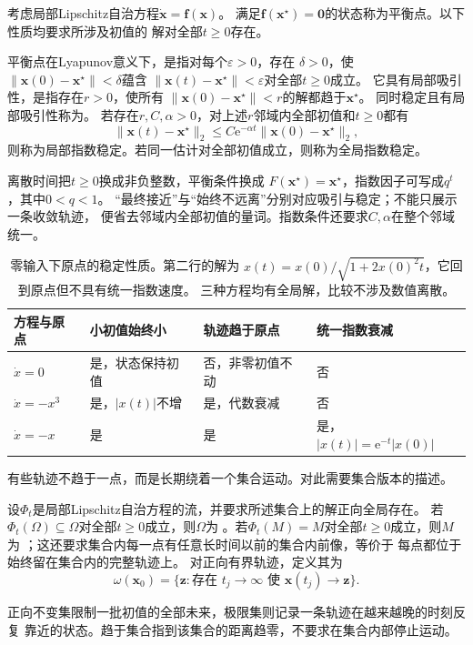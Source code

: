 \begin{definition}[平衡点与稳定性]
  \label{def:dynamical-equilibrium-stability}
  考虑局部Lipschitz自治方程$\dot{\bm x}=\bm f(\bm x)$。
  满足$\bm f(\bm x^\star)=\bm0$的状态称为平衡点。以下性质均要求所涉及初值的
  解对全部$t\geq0$存在。

  平衡点在Lyapunov意义下，是指对每个$\varepsilon>0$，存在
  $\delta>0$，使$\|\bm x(0)-\bm x^\star\|<\delta$蕴含
  $\|\bm x(t)-\bm x^\star\|<\varepsilon$对全部$t\geq0$成立。
  它具有局部吸引性，是指存在$r>0$，使所有
  $\|\bm x(0)-\bm x^\star\|<r$的解都趋于$\bm x^\star$。
  同时稳定且有局部吸引性称为。
  若存在$r,C,\alpha>0$，对上述$r$邻域内全部初值和$t\geq0$都有
  \[
    \|\bm x(t)-\bm x^\star\|_2
    \leq C\mathrm e^{-\alpha t}\|\bm x(0)-\bm x^\star\|_2,
  \]
  则称为局部指数稳定。若同一估计对全部初值成立，则称为全局指数稳定。
\end{definition}
离散时间把$t\geq0$换成非负整数，平衡条件换成
$F(\bm x^\star)=\bm x^\star$，指数因子可写成$q^t$，其中$0<q<1$。
“最终接近”与“始终不远离”分别对应吸引与稳定；不能只展示一条收敛轨迹，
便省去邻域内全部初值的量词。指数条件还要求$C,\alpha$在整个邻域统一。

\begin{table}[htbp]
  \centering
  \begin{tabularx}{\linewidth}{lXXX}
    \toprule
    方程与原点 & 小初值始终小 & 轨迹趋于原点 & 统一指数衰减\\
    \midrule
    $\dot x=0$ & 是，状态保持初值 & 否，非零初值不动 & 否\\
    $\dot x=-x^3$ & 是，$|x(t)|$不增 & 是，代数衰减 & 否\\
    $\dot x=-x$ & 是 & 是 & 是，$|x(t)|=\mathrm e^{-t}|x(0)|$\\
    \bottomrule
  \end{tabularx}
  \caption{零输入下原点的稳定性质。第二行的解为
  $x(t)=x(0)/\sqrt{1+2x(0)^2t}$，它回到原点但不具有统一指数速度。
  三种方程均有全局解，比较不涉及数值离散。}
  \label{tab:dynamical-stability-types}
\end{table}

有些轨迹不趋于一点，而是长期绕着一个集合运动。对此需要集合版本的描述。
\begin{definition}[不变集合与轨迹极限集]
  \label{def:dynamical-invariant-limit-sets}
  设$\Phi_t$是局部Lipschitz自治方程的流，并要求所述集合上的解正向全局存在。
  若$\Phi_t(\Omega)\subseteq\Omega$对全部$t\geq0$成立，则$\Omega$为
  。若$\Phi_t(M)=M$对全部$t\geq0$成立，则$M$为
  ；这还要求集合内每一点有任意长时间以前的集合内前像，等价于
  每点都位于始终留在集合内的完整轨迹上。
  对正向有界轨迹，定义其为
  \[
    \omega(\bm x_0)=
    \{\bm z:\text{存在 }t_j\to\infty\text{ 使 }\bm x(t_j)\to\bm z\}.
  \]
\end{definition}
正向不变集限制一批初值的全部未来，极限集则记录一条轨迹在越来越晚的时刻反复
靠近的状态。趋于集合指到该集合的距离趋零，不要求在集合内部停止运动。

